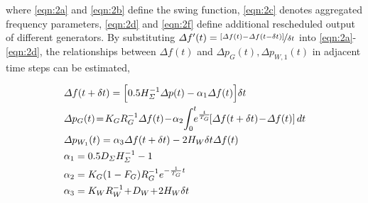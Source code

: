 \documentclass[lettersize,journal]{IEEEtran}
\newenvironment{newsubequations}{\small\begin{subequations}}{\end{subequations}}
\begin{document}

\noindent where \eqref{eqn:2a} and \eqref{eqn:2b} define the swing function, \eqref{eqn:2c} denotes aggregated frequency parameters, \eqref{eqn:2d} and \eqref{eqn:2f} define additional rescheduled output of different generators. By substituting $\varDelta f^{\prime}(t) = \nicefrac{[\varDelta f(t)-\varDelta f(t-\delta t)]}{ \delta t}$ into \eqref{eqn:2a}-\eqref{eqn:2d}, the relationships between $\varDelta f(t)$ and $\varDelta p_{G}(t), \varDelta p_{W,1}(t)$ in adjacent time steps can be estimated,

\vspace{-0.125in}
\begin{newsubequations}\label{eqn:3}
	\begin{align}
		 & \varDelta f(t+\delta t) = \Bigl [ 0.5{H_{\varSigma}^{-1}}\varDelta p(t)  - \alpha_1\varDelta f(t) \Bigr ] \delta t   \label{eqn:3a}                                                                  \\
		 & \varDelta p_{G}(t)\!=\!{K_{G} }{ R_{G}^{-1}} \varDelta f(t) \!-\! \alpha_2 \!\int_{0}^{t} \!\!\! e^{\frac{t}{T_G}} \!\!\left[\varDelta f(t+\delta t) \!-\! \varDelta f(t) \right] dt  \label{eqn:3b} \\
		 & \varDelta p_{W_1}(t) = \alpha_3 \varDelta f(t + \delta t) - 2H_{W} \delta t \varDelta f(t)  \label{eqn:3c}                                                                                           \\
		 & \alpha_1 = 0.5{D_{\varSigma}}{H_{\varSigma}^{-1}}-1 \label{eqn:3d}                                                                                                                                   \\
		 & \alpha_2 = {K_G(1-F_G)}{ R_{G}^{-1} }e^{-\frac{1}{T_G} t} \label{eqn:3e}                                                                                                                             \\
		 & \alpha_3 = {K_{W} } R_{W}^{-1} \!+\! D_{W} \!+\! 2H_{W} \delta t \label{eqn:3f}
	\end{align} \end{newsubequations}
\end{document}
